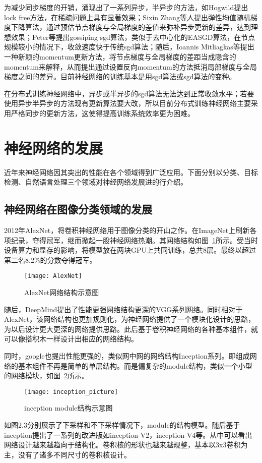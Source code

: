 为减少同步梯度的开销，涌现出了一系列异步，半异步的方法，如Hogwild提出lock free方法，在稀疏问题上具有显著效果；Sixin Zhang等人提出弹性均值随机梯度下降算法，通过预估节点梯度与全局梯度的差值来弥补异步更新的差异，达到理想效果；Peter等提出gossiping sgd算法，类似于去中心化的EASGD算法，在节点规模较小的情况下，收敛速度快于传统sgd算法；随后，Ioannis Mitliagkas等提出一种新颖的momentum更新方法，将节点梯度与全局梯度的差距当成隐含的momentum来解释，从而提出通过设置反向momentum的方法抵消局部梯度与全局梯度之间的差异。目前神经网络的训练基本是用sgd算法或sgd算法的变种。

在分布式训练神经网络中，异步或半异步的sgd算法无法达到正常收敛水平；若要使用异步半异步的方法现有更新算法要大改，所以目前分布式训练神经网络主要采用严格同步的更新方法，这使得提高训练系统效率更为困难。
\section{神经网络的发展}
近年来神经网络因其突出的性能在各个领域得到广泛应用。下面分别以分类、目标检测、自然语言处理三个领域对神经网络发展进的行介绍。
\subsection{神经网络在图像分类领域的发展}
2012年AlexNet，将卷积神经网络用于图像分类的开山之作。在ImageNet上刷新各项纪录，夺得冠军，继而掀起一股神经网络热潮。其网络结构如图~\ref{fig:AlexNet}所示。受当时设备算力和显存的影响，将模型放在两块GPU上共同训练，总共8层。最终以超过第二名8.2\%的分数夺得冠军。

\begin{figure}[htp]
\centering
\texttt{[image: AlexNet]}
\caption{AlexNet网络结构示意图}
\label{fig:AlexNet}
\end{figure}
随后，DeepMind提出了性能更强网络结构更深的VGG系列网络。同时相对于AlexNet，该网络结构也更加规则化，为神经网络提供了一个模块化设计的思路，为以后设计更大更深的网络提供思路。此后基于卷积神经网络的各种基本组件，就可以像搭积木一样设计出相应的网络结构。

同时，google也提出性能更强的，类似网中网的网络结构Inception系列。即组成网络的基本组件不再是简单的单层结构。而是偏复杂的module结构，类似一个小型的网络模块，如图~\ref{fig:inception_picture}所示。

\begin{figure}[htp]
\centering
\texttt{[image: inception\_picture]}
\caption{inception module结构示意图}
\label{fig:inception_picture}
\end{figure}
如图2.3分别展示了下采样和不下采样情况下，module的结构模型。随后基于inception提出了一系列的改进版如inception-V2，inception-V4等。从中可以看出网络设计越来越趋向于结构化。卷积核的形状也越来越规整，基本以3x3卷积为主，没有了诸多不同尺寸的卷积核设计。

